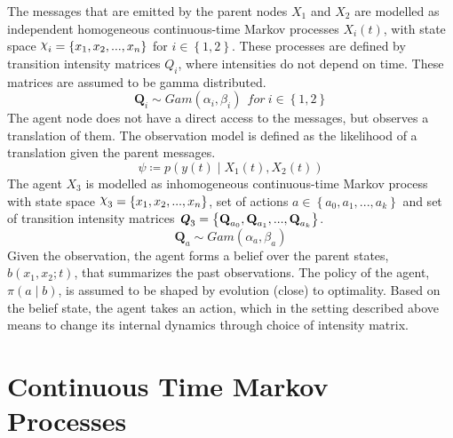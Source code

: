 The messages that are emitted by the parent nodes $X_{1}$ and $ X_{2} $ are modelled as independent homogeneous continuous-time Markov processes $X_{i}(t)$, with state space $ \rchi_{i} = \left\lbrace x_{1}, x_{2}, ..., x_{n} \right\rbrace  $ for $ i \in \left\lbrace 1,2 \right\rbrace $. These processes are defined by transition intensity matrices $ Q_{i} $, where intensities do not depend on time. These matrices are assumed to be gamma distributed.
\begin{equation}
\textbf{Q}_{i} \sim Gam(\alpha_{i}, \beta_{i})\ \ for\ i \in \left\lbrace 1,2\right\rbrace \nonumber
\end{equation}
The agent node does not have a direct access to the messages, but observes a translation of them. The observation model is defined as the likelihood of a translation given the parent messages.
\begin{equation}
\psi \coloneqq p(y(t) \mid X_{1}(t), X_{2}(t))
\end{equation}
The agent  $ X_{3} $ is modelled as inhomogeneous continuous-time Markov process with state space $ \rchi_{3} = \left\lbrace x_{1}, x_{2}, ..., x_{n} \right\rbrace  $, set of actions $ a \in \left\lbrace a_{0}, a_{1}, ..., a_{k}\right\rbrace  $ and set of transition intensity matrices $ \textbf{\textit{Q}}_{3} = \left\lbrace \textbf{Q}_{a_{0}}, \textbf{Q}_{a_{1}}, ..., \textbf{Q}_{a_{k}} \right\rbrace $. 
\begin{equation}
\textbf{Q}_{a} \sim Gam(\alpha_{a}, \beta_{a})
\end{equation}
Given the observation, the agent forms a belief over the parent states, $  b(x_{1}, x_{2}; t) $, that summarizes the past observations.\cite{Kaelbling2011} The policy of the agent, $ \pi(a \mid b) $, is assumed to be shaped by evolution (close) to optimality. Based on the belief state, the agent takes an action, which in the setting described above means to change its internal dynamics through choice of intensity matrix. 

\section{Continuous Time Markov Processes}

